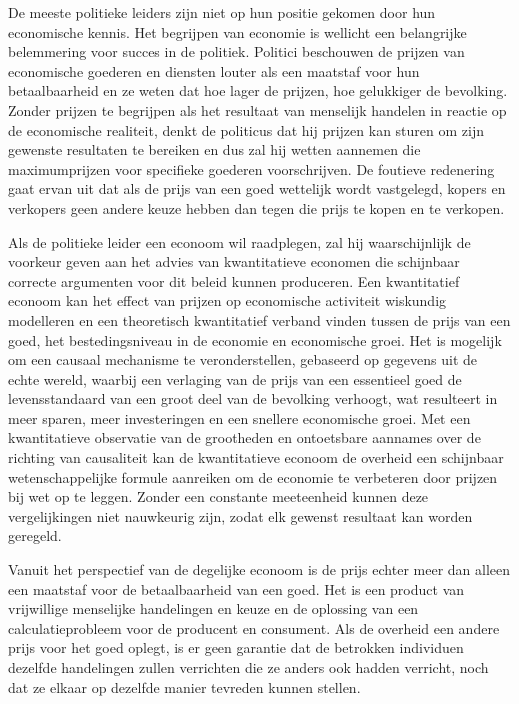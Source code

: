 \documentclass[
  a5paper,
  smalldemyvopaper,11pt,twoside,onecolumn,openright,extrafontsizes,
hidelinks]{memoir}
\begin{document}
De meeste politieke leiders zijn niet op hun positie gekomen door hun
economische kennis. Het begrijpen van economie is wellicht een
belangrijke belemmering voor succes in de politiek. Politici beschouwen
de prijzen van economische goederen en diensten louter als een maatstaf
voor hun betaalbaarheid en ze weten dat hoe lager de prijzen, hoe
gelukkiger de bevolking. Zonder prijzen te begrijpen als het resultaat
van menselijk handelen in reactie op de economische realiteit, denkt de
politicus dat hij prijzen kan sturen om zijn gewenste resultaten te
bereiken en dus zal hij wetten aannemen die maximumprijzen voor
specifieke goederen voorschrijven. De foutieve redenering gaat ervan uit
dat als de prijs van een goed wettelijk wordt vastgelegd, kopers en
verkopers geen andere keuze hebben dan tegen die prijs te kopen en te
verkopen.

Als de politieke leider een econoom wil raadplegen, zal hij
waarschijnlijk de voorkeur geven aan het advies van kwantitatieve
economen die schijnbaar correcte argumenten voor dit beleid kunnen
produceren. Een kwantitatief econoom kan het effect van prijzen op
economische activiteit wiskundig modelleren en een theoretisch
kwantitatief verband vinden tussen de prijs van een goed, het
bestedingsniveau in de economie en economische groei. Het is mogelijk om
een causaal mechanisme te veronderstellen, gebaseerd op gegevens uit de
echte wereld, waarbij een verlaging van de prijs van een essentieel goed
de levensstandaard van een groot deel van de bevolking verhoogt, wat
resulteert in meer sparen, meer investeringen en een snellere
economische groei. Met een kwantitatieve observatie van de grootheden en
ontoetsbare aannames over de richting van causaliteit kan de
kwantitatieve econoom de overheid een schijnbaar wetenschappelijke
formule aanreiken om de economie te verbeteren door prijzen bij wet op
te leggen. Zonder een constante meeteenheid kunnen deze vergelijkingen
niet nauwkeurig zijn, zodat elk gewenst resultaat kan worden geregeld.

Vanuit het perspectief van de degelijke econoom is de prijs echter meer
dan alleen een maatstaf voor de betaalbaarheid van een goed. Het is een
product van vrijwillige menselijke handelingen en keuze en de oplossing
van een calculatieprobleem voor de producent en consument. Als de
overheid een andere prijs voor het goed oplegt, is er geen garantie dat
de betrokken individuen dezelfde handelingen zullen verrichten die ze
anders ook hadden verricht, noch dat ze elkaar op dezelfde manier
tevreden kunnen stellen.
\end{document}
